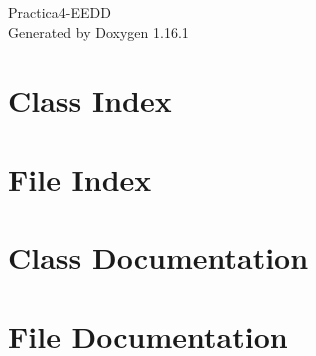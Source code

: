 \documentclass[twoside]{book}
\newcommand{\+}{\discretionary{\mbox{\scriptsize$\hookleftarrow$}}{}{}}
\newcommand{\clearemptydoublepage}{%
    \newpage{\pagestyle{empty}\cleardoublepage}%
  }
\begin{document}
  \raggedbottom
    \hypersetup{pageanchor=false,
                bookmarksnumbered=true,
                pdfencoding=unicode
               }
  \begin{titlepage}
  \vspace*{7cm}
  \begin{center}%
  {\Large Practica4-\/\+EEDD}\\
  \vspace*{1cm}
  {\large Generated by Doxygen 1.16.1}\\
  \end{center}
  \end{titlepage}
  \clearemptydoublepage
  \tableofcontents
  \clearemptydoublepage
  \hypersetup{pageanchor=true}
\chapter{Class Index}

\chapter{File Index}

\chapter{Class Documentation}





\chapter{File Documentation}






  \backmatter
  \newpage
  \clearemptydoublepage
  \printindex
\end{document}
